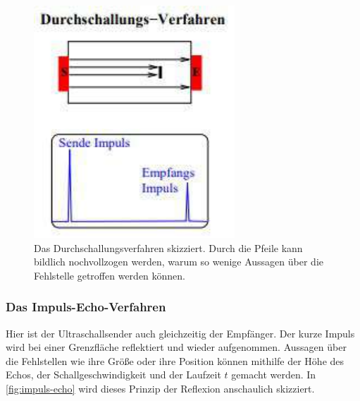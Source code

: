 \begin{figure}
    \centering
    \includegraphics[width=\textwidth]{content/durchschall.pdf}
    \caption{Das Durchschallungsverfahren skizziert. Durch die Pfeile kann bildlich nochvollzogen werden, warum so wenige Aussagen über die Fehlstelle getroffen werden können.\cite{anleitung}}
    \label{fig:durchschall}
\end{figure}

\subsubsection{Das Impuls-Echo-Verfahren}
\label{subsubsec:impuls-echo}
Hier ist der Ultraschallsender auch gleichzeitig der Empfänger.
Der kurze Impuls wird bei einer Grenzfläche reflektiert und wieder aufgenommen.
Aussagen über die Fehlstellen wie ihre Größe oder ihre Position können mithilfe der Höhe des Echos, der Schallgeschwindigkeit und der Laufzeit $t$ gemacht werden.
In \autoref{fig:impuls-echo} wird dieses Prinzip der Reflexion anschaulich skizziert.

